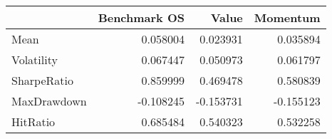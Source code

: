 \begin{tabular}{lrrr}
\toprule
{} &  Benchmark OS &     Value &  Momentum \\
\midrule
Mean        &      0.058004 &  0.023931 &  0.035894 \\
Volatility  &      0.067447 &  0.050973 &  0.061797 \\
SharpeRatio &      0.859999 &  0.469478 &  0.580839 \\
MaxDrawdown &     -0.108245 & -0.153731 & -0.155123 \\
HitRatio    &      0.685484 &  0.540323 &  0.532258 \\
\bottomrule
\end{tabular}
